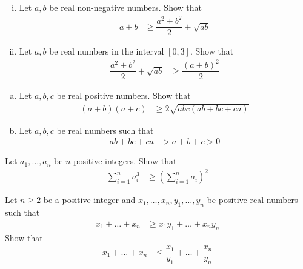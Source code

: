 \documentclass{subfile}
\begin{document}
		\begin{problem}
			\begin{enumerate}[(i)]
				\item Let $a,b$ be real non-negative numbers. Show that
					\begin{align*}
						a+b
							& \geq \dfrac{a^{2}+b^{2}}{2}+\sqrt{ab}
					\end{align*}
				\item Let $a,b$ be real numbers in the interval $[0,3]$. Show that
					\begin{align*}
						\dfrac{a^{2}+b^{2}}{2}+\sqrt{ab}
							& \geq \dfrac{(a+b)^{2}}{2}
					\end{align*}
			\end{enumerate}
		\end{problem}
	
		\begin{problem}
			\begin{enumerate}[(a)]
				\item Let $a,b,c$ be real positive numbers. Show that
					\begin{align*}
						(a+b)(a+c)
							& \geq2\sqrt{abc(ab+bc+ca)}
					\end{align*}
				\item Let $a,b,c$ be real numbers such that
					\begin{align*}
						ab+bc+ca
							& > a+b+c>0
					\end{align*}
			\end{enumerate}
		\end{problem}
	
		\begin{problem}
			Let $a_{1},\ldots,a_{n}$ be $n$ positive integers. Show that
				\begin{align*}
					\sum_{i=1}^{n}a_{i}^{3}
						& \geq\left(\sum_{i=1}^{n}a_{i}\right)^{2}
				\end{align*}
		\end{problem}
	
		\begin{problem}
			Let $n\geq2$ be a positive integer and $x_{1},\ldots,x_{n},y_{1},\ldots,y_{n}$ be positive real numbers such that
				\begin{align*}
					x_{1}+\ldots+x_{n}
						& \geq x_{1}y_{1}+\ldots+x_{n}y_{n}
				\end{align*}
			Show that
				\begin{align*}
					x_{1}+\ldots+x_{n}
						& \leq \dfrac{x_{1}}{y_{1}}+\ldots+\dfrac{x_{n}}{y_{n}}
				\end{align*}
		\end{problem}
	
\end{document}

